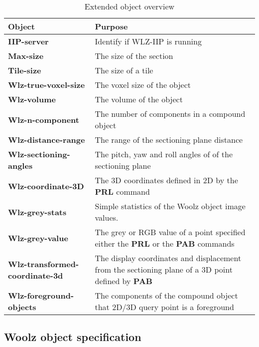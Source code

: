 \documentclass[11pt]{article}
\newcommand{\com}[1]{\textbf{#1}}
\begin{document}
\begin{table}[!hp]
\begin{tabular}{|p{}|p{}|}
\hline
\textbf{Object} &\textbf{Purpose}\\
\hline
\com{IIP-server}            & Identify if WLZ-IIP is running\\
\com{Max-size}              & The size of the section\\
\com{Tile-size}             & The size of a tile\\
\com{Wlz-true-voxel-size}   & The voxel size of the object\\
\com{Wlz-volume}            & The volume of the object\\
\com{Wlz-n-component}       & The number of components in a compound object\\
\com{Wlz-distance-range}    & The range of the sectioning plane distance\\
\com{Wlz-sectioning-angles} & The pitch, yaw and roll angles of of the sectioning plane\\
\com{Wlz-coordinate-3D}     & The 3D coordinates defined in 2D by the \com{PRL} command\\
\com{Wlz-grey-stats}        & Simple statistics of the Woolz object image values.\\
\com{Wlz-grey-value}        & The grey or RGB value of a point specified either the \com{PRL} or the \com{PAB} commands\\
\com{Wlz-transformed-coordinate-3d} & The display coordinates and displacement from the sectioning plane of a 3D point defined by \com{PAB}\\
\com{Wlz-foreground-objects}& The components of the compound object that 2D/3D query point is a foreground\\
\hline
\end{tabular}
\caption{Extended object overview}
\label{tab:objects}
\end{table}


\subsection{Woolz object specification}
\end{document}
